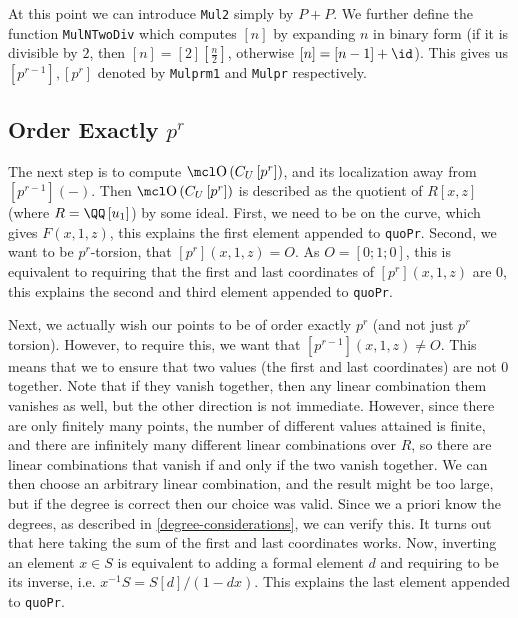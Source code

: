 At this point we can introduce \texttt{Mul2} simply by $P+P$.
We further define the function \texttt{MulNTwoDiv} which computes $\left[n\right]$ by expanding $n$ in binary form (if it is divisible by $2$, then $\left[n\right] = \left[2\right]\left[\frac{n}{2}\right]$, otherwise $\left[n\right] = \left[n-1\right]+\id$).
This gives us $\left[p^{r-1}\right],\left[p^r\right]$ denoted by \texttt{Mulprm1} and \texttt{Mulpr} respectively.

\subsection{Order Exactly $p^r$}

The next step is to compute $\OO\left(C_U\left[p^r\right]\right)$, and its localization away from $[p^{r-1}]\left(-\right)$.
Then $\OO\left(C_U\left[p^r\right]\right)$ is described as the quotient of $R\left[x, z\right]$ (where $R = \QQ\left[u_1\right]$) by some ideal.
First, we need to be on the curve, which gives $F\left(x,1,z\right)$, this explains the first element appended to \texttt{quoPr}.
Second, we want to be $p^r$-torsion, that $\left[p^r\right]\left(x,1,z\right) = O$.
As $O = \left[0;1;0\right]$, this is equivalent to requiring that the first and last coordinates of $\left[p^r\right]\left(x,1,z\right)$ are $0$, this explains the second and third element appended to \texttt{quoPr}.

Next, we actually wish our points to be of order exactly $p^r$ (and not just $p^r$ torsion).
However, to require this, we want that $\left[p^{r-1}\right]\left(x,1,z\right) \neq O$.
This means that we to ensure that two values (the first and last coordinates) are not $0$ together.
Note that if they vanish together, then any linear combination them vanishes as well, but the other direction is not immediate.
However, since there are only finitely many points, the number of different values attained is finite, and there are infinitely many different linear combinations over $R$, so there are linear combinations that vanish if and only if the two vanish together.
We can then choose an arbitrary linear combination, and the result might be too large, but if the degree is correct then our choice was valid.
Since we a priori know the degrees, as described in \ref{degree-considerations}, we can verify this.
It turns out that here taking the sum of the first and last coordinates works.
Now, inverting an element $x \in S$ is equivalent to adding a formal element $d$ and requiring to be its inverse, i.e. $x^{-1} S = S\left[d\right]/(1 - dx)$.
This explains the last element appended to \texttt{quoPr}.

